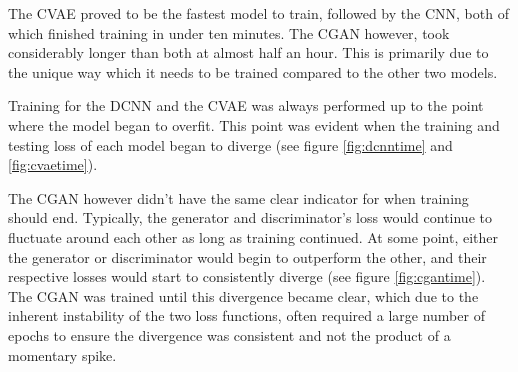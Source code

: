 \documentclass{l4proj}
\begin{document}
The CVAE proved to be the fastest model to train, followed by the CNN, both of which finished training in under ten minutes. The CGAN however, took considerably longer than both at almost half an hour. This is primarily due to the unique way which it needs to be trained compared to the other two models.

Training for the DCNN and the CVAE was always performed up to the point where the model began to overfit. This point was evident when the training and testing loss of each model began to diverge (see figure \ref{fig:dcnntime} and \ref{fig:cvaetime}). 

The CGAN however didn't have the same clear indicator for when training should end. Typically, the generator and discriminator's loss would continue to fluctuate around each other as long as training continued. At some point, either the generator or discriminator would begin to outperform the other, and their respective losses would start to consistently diverge (see figure \ref{fig:cgantime}). The CGAN was trained until this divergence became clear, which due to the inherent instability of the two loss functions, often required a large number of epochs to ensure the divergence was consistent and not the product of a momentary spike.
\end{document}
